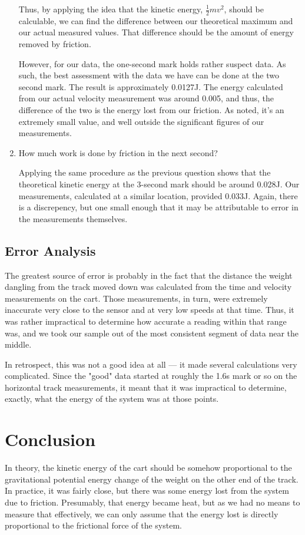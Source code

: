 \begin{enumerate}
Thus, by applying the idea that the kinetic energy, \begin{math}\frac{1}{2}mv^2\end{math}, should be calculable, we can find the difference between our theoretical maximum and our actual measured values.
That difference should be the amount of energy removed by friction.

However, for our data, the one-second mark holds rather suspect data.
As such, the best assessment with the data we have can be done at the two second mark.
The result is approximately 0.0127J.
The energy calculated from our actual velocity measurement was around 0.005, and thus, the difference of the two is the energy lost from our friction.
As noted, it's an extremely small value, and well outside the significant figures of our measurements.

\item How much work is done by friction in the next second?

Applying the same procedure as the previous question shows that the theoretical kinetic energy at the 3-second mark should be around 0.028J.
Our measurements, calculated at a similar location, provided 0.033J.
Again, there is a discrepency, but one small enough that it may be attributable to error in the measurements themselves.

\end{enumerate}

\subsection{Error Analysis}

The greatest source of error is probably in the fact that the distance the weight dangling from the track moved down was calculated from the time and velocity measurements on the cart.
Those measurements, in turn, were extremely inaccurate very close to the sensor and at very low speeds at that time.
Thus, it was rather impractical to determine how accurate a reading within that range was, and we took our sample out of the most consistent segment of data near the middle.

In retrospect, this was not a good idea at all --- it made several calculations very complicated.
Since the "good" data started at roughly the 1.6s mark or so on the horizontal track measurements, it meant that it was impractical to determine, exactly, what the energy of the system was at those points.

\section{Conclusion}

In theory, the kinetic energy of the cart should be somehow proportional to the gravitational potential energy change of the weight on the other end of the track.
In practice, it was fairly close, but there was some energy lost from the system due to friction.
Presumably, that energy became heat, but as we had no means to measure that effectively, we can only assume that the energy lost is directly proportional to the frictional force of the system.

